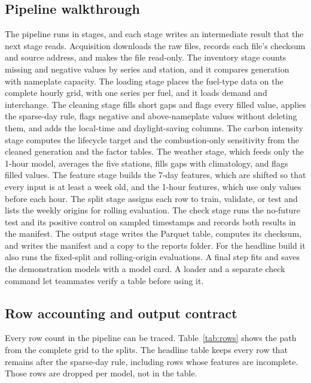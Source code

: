 \documentclass[10pt,journal,compsoc]{IEEEtran}
\begin{document}
\subsection{Pipeline walkthrough}
The pipeline runs in stages, and each stage writes an intermediate result that the next stage reads. Acquisition downloads the raw files, records each file's checksum and source address, and makes the file read-only. The inventory stage counts missing and negative values by series and station, and it compares generation with nameplate capacity. The loading stage places the fuel-type data on the complete hourly grid, with one series per fuel, and it loads demand and interchange. The cleaning stage fills short gaps and flags every filled value, applies the sparse-day rule, flags negative and above-nameplate values without deleting them, and adds the local-time and daylight-saving columns. The carbon intensity stage computes the lifecycle target and the combustion-only sensitivity from the cleaned generation and the factor tables. The weather stage, which feeds only the 1-hour model, averages the five stations, fills gaps with climatology, and flags filled values. The feature stage builds the 7-day features, which are shifted so that every input is at least a week old, and the 1-hour features, which use only values before each hour. The split stage assigns each row to train, validate, or test and lists the weekly origins for rolling evaluation. The check stage runs the no-future test and its positive control on sampled timestamps and records both results in the manifest. The output stage writes the Parquet table, computes its checksum, and writes the manifest and a copy to the reports folder. For the headline build it also runs the fixed-split and rolling-origin evaluations. A final step fits and saves the demonstration models with a model card. A loader and a separate check command let teammates verify a table before using it.

\subsection{Row accounting and output contract}
Every row count in the pipeline can be traced. Table~\ref{tab:rows} shows the path from the complete grid to the splits. The headline table keeps every row that remains after the sparse-day rule, including rows whose features are incomplete. Those rows are dropped per model, not in the table.
\end{document}
